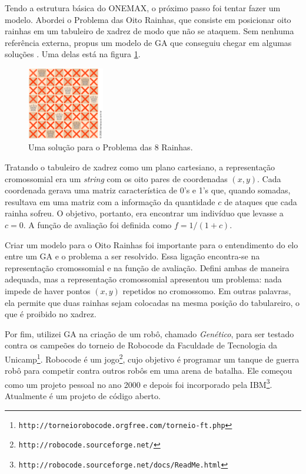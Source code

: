 	Tendo a estrutura básica do ONEMAX, o próximo passo foi tentar fazer um modelo. Abordei o Problema das Oito Rainhas, que consiste em posicionar oito rainhas em um tabuleiro de xadrez de modo que não se ataquem. Sem nenhuma referência externa, propus um modelo de GA que conseguiu chegar em algumas soluções \cite{qualificacao_adriano}. Uma delas está na figura \ref{fig:OitoRainhasSolucao}.
	
	\begin{figure}[htbp]
		\centering
			\includegraphics[width=0.30\textwidth]{figs/materiais_metodo/ga/OitoRainhasSolucao.png}
		\caption{Uma solução para o Problema das 8 Rainhas.}
		\label{fig:OitoRainhasSolucao}
	\end{figure}
	
	Tratando o tabuleiro de xadrez como um plano cartesiano, a representação cromossomial era um \emph{string} com os oito pares de coordenadas $(x,y)$. Cada coordenada gerava uma matriz característica de 0's e 1's que, quando somadas, resultava em uma matriz com a informação da quantidade $c$ de ataques que cada rainha sofreu. O objetivo, portanto, era encontrar um indivíduo que levasse a $c = 0$. A função de avaliação foi definida como $f = 1/(1 + c)$.
	
	Criar um modelo para o Oito Rainhas foi importante para o entendimento do elo entre um GA e o problema a ser resolvido. Essa ligação encontra-se na representação cromossomial e na função de avaliação. Defini ambas de maneira adequada, mas a representação cromossomial apresentou um problema: nada impede de haver pontos $(x,y)$ repetidos no cromossomo. Em outras palavras, ela permite que duas rainhas sejam colocadas na mesma posição do tabulareiro, o que é proibido no xadrez. 
	
	Por fim, utilizei GA na criação de um robô, chamado \emph{Genético}, para ser testado contra os campeões do torneio de Robocode da Faculdade de Tecnologia da Unicamp\footnote{\texttt{http://torneiorobocode.orgfree.com/torneio-ft.php}}. Robocode é um jogo\footnote{\texttt{http://robocode.sourceforge.net/}}, cujo objetivo é programar um tanque de guerra robô para competir contra outros robôs em uma arena de batalha. Ele começou como um projeto pessoal no ano 2000 e depois foi incorporado pela IBM\footnote{\texttt{http://robocode.sourceforge.net/docs/ReadMe.html}}. Atualmente é um projeto de código aberto.
	
